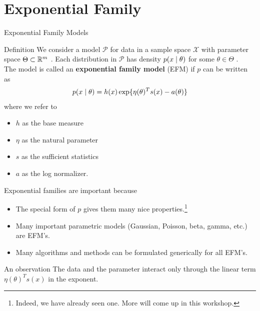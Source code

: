 \documentclass[10pt]{beamer}
\renewcommand{\bf}[1]{\textbf{{#1}}}
\begin{document}
\section{Exponential Family}


\begin{frame}{Exponential Family Models}

\begin{sblock}{Definition}
We consider a model $\mathcal{P}$ for data in a sample space $\mathcal{X}$ with parameter space $\Theta \subset \mathbb{R}^m$ . Each distribution in $\mathcal{P}$ has density $p(x \; | \; \theta)$ for some $\theta \in \Theta$ . \\
\vfill
The model is called an \bf{exponential family model} (EFM) if $p$ can be written as
\begin{align*}
 p(x \; | \; \theta) = h(x) \exp \{ \eta(\theta)^T s(x) - a(\theta)\} 
 \end{align*}
where we refer to 
\begin{itemize}
\item $h$ as the base measure
\item  $\eta$ as the natural parameter
\item $s$ as the sufficient statistics
\item $a$ as the log normalizer. 
\end{itemize}
\end{sblock}
\end{frame}

\begin{frame}



\begin{sblock}{Exponential families are important because}
\begin{itemize}
\item The special form of $p$ gives them many nice properties.\footnote{Indeed, we have already seen one.  More will come up in this workshop.}
\item Many important parametric models (Gaussian, Poisson, beta, gamma, etc.) are EFM's.
\item Many algorithms and methods can be formulated generically for all EFM's. 
\end{itemize}
\end{sblock}
\vfill
\begin{sblock}{An observation}
The data and the parameter interact only through the linear term $\eta(\theta)^T s(x)$ in the exponent.
\end{sblock}

%
%
\end{frame}
\end{document}
